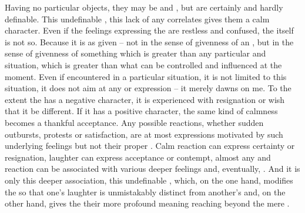 Having no particular objects, they may be  and , but
are certainly  and hardly definable.  This undefinable ,
this lack of any  correlates gives them a calm character.
Even if the  feelings expressing the  are
restless and confused, the  itself is 
not so. Because it is  as given -- not in the sense of 
givenness of an , but in the sense of givenness of something which is
greater than any particular  and situation, which is greater than
what can be controlled and influenced at the moment. Even if encountered in a
particular situation, it is not limited to this situation, it does not aim
at any  or expression -- it merely dawns on me. To the extent the
 has a negative character, it is experienced with resignation or
wish that it be different. If it has a positive character, the same kind of
calmness becomes a thankful acceptance.  Any possible reactions, whether sudden
outbursts, protests or satisfaction, are at most  expressions motivated by
such underlying feelings but not their proper . Calm reaction can express
certainty or resignation, laughter can express acceptance or contempt, almost
any  and reaction can be associated with various deeper feelings
and, eventually, . And it is only this deeper association, this
undefinable , which, on the one hand, modifies the  so
that one's laughter is unmistakably distinct from another's and, on the other
hand, gives the  their more profound meaning reaching beyond
the mere .


